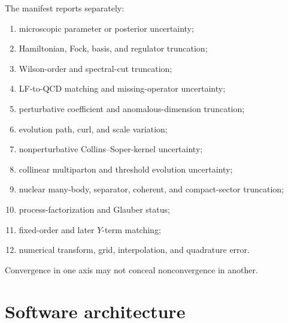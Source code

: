 \documentclass[11pt]{article}
\begin{document}
The manifest reports separately:
\begin{enumerate}
\item microscopic parameter or posterior uncertainty;
\item Hamiltonian, Fock, basis, and regulator truncation;
\item Wilson-order and spectral-cut truncation;
\item LF-to-QCD matching and missing-operator uncertainty;
\item perturbative coefficient and anomalous-dimension truncation;
\item evolution path, curl, and scale variation;
\item nonperturbative Collins--Soper-kernel uncertainty;
\item collinear multiparton and threshold evolution uncertainty;
\item nuclear many-body, separator, coherent, and compact-sector truncation;
\item process-factorization and Glauber status;
\item fixed-order and later \(Y\)-term matching;
\item numerical transform, grid, interpolation, and quadrature error.
\end{enumerate}
Convergence in one axis may not conceal nonconvergence in another.

\section{Software architecture}
\label{sec:software}
\end{document}
